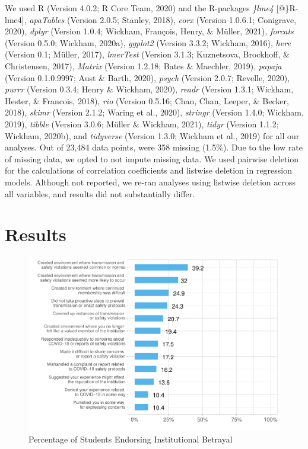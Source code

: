 \documentclass[
  english,
  man, noextraspace]{apa6}
\begin{document}
We used R (Version 4.0.2; R Core Team, 2020) and the R-packages \emph{\}lme4} {[}@\}R-lme4{]}, \emph{apaTables} (Version 2.0.5; Stanley, 2018), \emph{corx} (Version 1.0.6.1; Conigrave, 2020), \emph{dplyr} (Version 1.0.4; Wickham, François, Henry, \& Müller, 2021), \emph{forcats} (Version 0.5.0; Wickham, 2020a), \emph{ggplot2} (Version 3.3.2; Wickham, 2016), \emph{here} (Version 0.1; Müller, 2017), \emph{lmerTest} (Version 3.1.3; Kuznetsova, Brockhoff, \& Christensen, 2017), \emph{Matrix} (Version 1.2.18; Bates \& Maechler, 2019), \emph{papaja} (Version 0.1.0.9997; Aust \& Barth, 2020), \emph{psych} (Version 2.0.7; Revelle, 2020), \emph{purrr} (Version 0.3.4; Henry \& Wickham, 2020), \emph{readr} (Version 1.3.1; Wickham, Hester, \& Francois, 2018), \emph{rio} (Version 0.5.16; Chan, Chan, Leeper, \& Becker, 2018), \emph{skimr} (Version 2.1.2; Waring et al., 2020), \emph{stringr} (Version 1.4.0; Wickham, 2019), \emph{tibble} (Version 3.0.6; Müller \& Wickham, 2021), \emph{tidyr} (Version 1.1.2; Wickham, 2020b), and \emph{tidyverse} (Version 1.3.0; Wickham et al., 2019) for all our analyses. Out of 23,484 data points, were 358 missing (1.5\%). Due to the low rate of missing data, we opted to not impute missing data. We used pairwise deletion for the calculations of correlation coefficients and listwise deletion in regression models. Although not reported, we re-ran analyses using listwise deletion across all variables, and results did not substantially differ.

\hypertarget{results}{%
\section{Results}\label{results}}

\begin{figure}[H]

{\centering \includegraphics[width=\textwidth]{papaja_doc_files/figure-latex/figure1-1} 

}

\caption{Percentage of Students Endorsing Institutional Betrayal
}\label{fig:figure1}
\end{figure}
\end{document}
